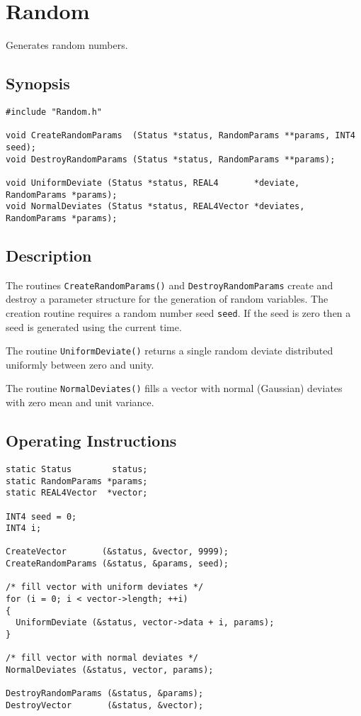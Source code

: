 \documentclass{article}
\begin{document}
\section{Random}

Generates random numbers.

\subsection{Synopsis}
\begin{verbatim}
#include "Random.h"

void CreateRandomParams  (Status *status, RandomParams **params, INT4 seed);
void DestroyRandomParams (Status *status, RandomParams **params);

void UniformDeviate (Status *status, REAL4       *deviate,  RandomParams *params);
void NormalDeviates (Status *status, REAL4Vector *deviates, RandomParams *params);
\end{verbatim}

\subsection{Description}

The routines \verb+CreateRandomParams()+ and \verb+DestroyRandomParams+ create
and destroy a parameter structure for the generation of random variables.  The
creation routine requires a random number seed \verb+seed+.  If the seed is
zero then a seed is generated using the current time.

The routine \verb+UniformDeviate()+ returns a single random deviate
distributed uniformly between zero and unity.  

The routine \verb+NormalDeviates()+ fills a vector with normal (Gaussian)
deviates with zero mean and unit variance.

\subsection{Operating Instructions}

\begin{verbatim}
static Status        status;
static RandomParams *params;
static REAL4Vector  *vector;

INT4 seed = 0;
INT4 i;

CreateVector       (&status, &vector, 9999);
CreateRandomParams (&status, &params, seed);

/* fill vector with uniform deviates */
for (i = 0; i < vector->length; ++i)
{
  UniformDeviate (&status, vector->data + i, params);
}

/* fill vector with normal deviates */
NormalDeviates (&status, vector, params);

DestroyRandomParams (&status, &params);
DestroyVector       (&status, &vector);
\end{verbatim}
\end{document}
